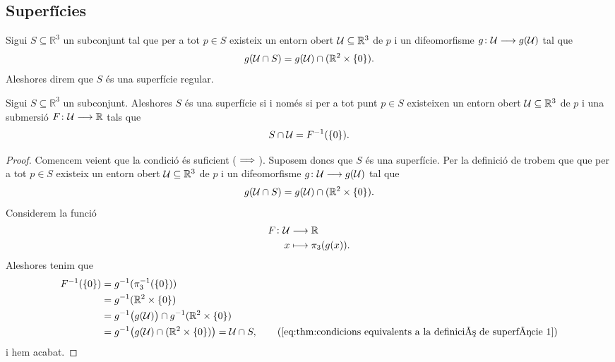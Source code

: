 \documentclass[../../Main.tex]{subfiles}
\begin{document}
	\subsection{Superfícies}
	\begin{definition}[Superfície]
		\label{def:superfície}
		Sigui \(S\subseteq\mathbb{R}^{3}\) un subconjunt tal que per a tot \(p\in S\) existeix un entorn obert \(\mathcal{U}\subseteq\mathbb{R}^{3}\) de \(p\) i un difeomorfisme \(g\colon\mathcal{U}\longrightarrow g(\mathcal{U})\) tal que
		\[g(\mathcal{U}\cap S)=g(\mathcal{U})\cap(\mathbb{R}^{2}\times\{0\}).\]
		Aleshores direm que \(S\) és una superfície regular.
	\end{definition}
	\begin{theorem}
		\label{thm:condicions equivalents a la definició de superfície}
		Sigui \(S\subseteq\mathbb{R}^{3}\) un subconjunt. Aleshores \(S\) és una superfície si i només si per a tot punt \(p\in S\) existeixen un entorn obert \(\mathcal{U}\subseteq\mathbb{R}^{3}\) de \(p\) i una submersió \(F\colon\mathcal{U}\longrightarrow\mathbb{R}\) tals que
		\[S\cap\mathcal{U}=F^{-1}(\{0\}).\]
		\begin{proof}
			Comencem veient que la condició és suficient (\(\implies\)). Suposem doncs que \(S\) és una superfície. Per la definició de  trobem que que per a tot \(p\in S\) existeix un entorn obert \(\mathcal{U}\subseteq\mathbb{R}^{3}\) de \(p\) i un difeomorfisme \(g\colon\mathcal{U}\longrightarrow g(\mathcal{U})\) tal que
			\begin{equation}
				\label{eq:thm:condicions equivalents a la definició de superfície 1}
				g(\mathcal{U}\cap S)=g(\mathcal{U})\cap(\mathbb{R}^{2}\times\{0\}).
			\end{equation}
			Considerem la funció
			\begin{align*}
				F\colon\mathcal{U}&\longrightarrow\mathbb{R} \\
				x&\longmapsto\pi_{3}(g(x)).
			\end{align*}
			Aleshores tenim que
			\begin{align*}
				F^{-1}(\{0\})&=g^{-1}(\pi_{3}^{-1}(\{0\})) \\
				&=g^{-1}(\mathbb{R}^{2}\times\{0\}) \\
				&=g^{-1}\big(g(\obert{U})\big)\cap g^{-1}(\mathbb{R}^{2}\times\{0\})\\
				&=g^{-1}\big(g(\obert{U})\cap(\mathbb{R}^{2}\times\{0\})\big)=\obert{U}\cap S, \tag{\ref{eq:thm:condicions equivalents a la definició de superfície 1}} %
			\end{align*}
			i hem acabat.
			

\end{proof}
\end{theorem}
\end{document}
